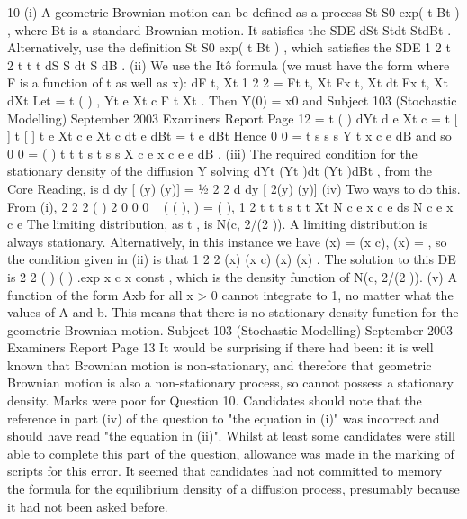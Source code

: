 10 (i) A geometric Brownian motion can be defined as a process
St S0 exp( t Bt ) , where Bt is a standard Brownian motion.
It satisfies the SDE dSt Stdt StdBt .
Alternatively, use the definition St S0 exp( t Bt ) , which satisfies the SDE
1 2
t 2 t t t dS S dt S dB .
(ii) We use the Itô formula (we must have the form where F is a function of t as
well as x):
dF t, Xt 1 2
2 = Ft t, Xt Fx t, Xt dt Fx t, Xt dXt
Let = t ( ) ,
Yt e Xt c F t Xt . Then Y(0) = x0 and
Subject 103 (Stochastic Modelling) September 2003 Examiners Report
Page 12
= t ( )
dYt d e Xt c
= t [ ] t [ ] t
e Xt c e Xt c dt e dBt
= t
e dBt
Hence 0
0
=
t
s
s
s
Y t x c e dB
and so 0
0
= ( )
t
t t s
t s
s
X c e x c e e dB .
(iii) The required condition for the stationary density of the diffusion Y solving
dYt (Yt )dt (Yt )dBt , from the Core Reading, is
d
dy
[ (y) (y)] = ½
2
2
d
dy
[ 2(y) (y)]
(iv) Two ways to do this. From (i),
2
2 2 ( ) 2
0 0 0
~ ( ( ), ) = ( ), 1
2
t t t s t t
Xt N c e x c e ds N c e x c e
The limiting distribution, as t , is N(c, 2/(2 )). A limiting distribution is
always stationary.
Alternatively, in this instance we have (x) = (x c), (x) = , so the
condition given in (ii) is that
1 2
2
(x) (x c) (x) (x) .
The solution to this DE is
2
2
( )
( ) .exp
x c
x const ,
which is the density function of N(c, 2/(2 )).
(v) A function of the form Axb for all x > 0 cannot integrate to 1, no matter what
the values of A and b. This means that there is no stationary density function
for the geometric Brownian motion.
Subject 103 (Stochastic Modelling) September 2003 Examiners Report
Page 13
It would be surprising if there had been: it is well known that Brownian
motion is non-stationary, and therefore that geometric Brownian motion is
also a non-stationary process, so cannot possess a stationary density.
Marks were poor for Question 10. Candidates should note that the reference in part (iv) of the
question to "the equation in (i)" was incorrect and should have read "the equation in (ii)". Whilst at
least some candidates were still able to complete this part of the question, allowance was made in the
marking of scripts for this error.
It seemed that candidates had not committed to memory the formula for the equilibrium density of a
diffusion process, presumably because it had not been asked before.


